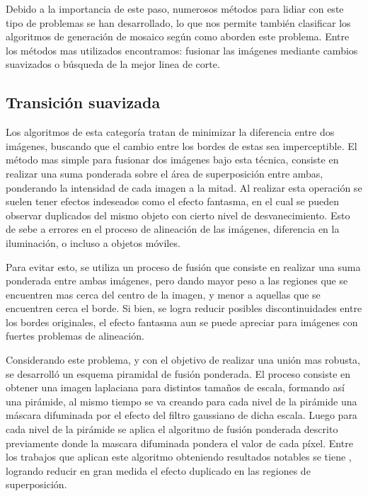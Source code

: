 Debido a la importancia de este paso, numerosos métodos para lidiar con este tipo de problemas se han desarrollado, lo que nos permite también clasificar los algoritmos de generación de mosaico según como aborden este problema. Entre los métodos mas utilizados encontramos: fusionar las imágenes mediante cambios suavizados o búsqueda de la mejor linea de corte.

\subsection*{Transición suavizada}

Los algoritmos de esta categoría tratan de minimizar la diferencia entre dos imágenes, buscando que el cambio entre los bordes de estas sea imperceptible. El método mas simple para fusionar dos imágenes bajo esta técnica, consiste en realizar una suma ponderada sobre el área de superposición entre ambas, ponderando la intensidad de cada imagen a la mitad. Al realizar esta operación se suelen tener efectos indeseados como el efecto fantasma, en el cual se pueden observar duplicados del mismo objeto con cierto nivel de desvanecimiento. Esto de sebe a errores en el proceso de alineación de las imágenes, diferencia en la iluminación, o incluso a objetos móviles. 

Para evitar esto, se utiliza un proceso de fusión que consiste en realizar una suma ponderada entre ambas imágenes, pero dando mayor peso a las regiones que se encuentren mas cerca del centro de la imagen, y menor a aquellas que se encuentren cerca el borde. Si bien, se logra reducir posibles discontinuidades entre los bordes originales, el efecto fantasma aun se puede apreciar para imágenes con fuertes problemas de alineación.

Considerando este problema, y con el objetivo de realizar una unión mas robusta, se desarrolló un esquema piramidal de fusión ponderada. El proceso consiste en obtener una imagen laplaciana para distintos tamaños de escala, formando así una pirámide, al mismo tiempo se va creando para cada nivel de la pirámide una máscara difuminada por el efecto del filtro gaussiano de dicha escala. Luego para cada nivel de la pirámide se aplica el algoritmo de fusión ponderada descrito previamente donde la mascara  difuminada pondera el valor de cada píxel. Entre los trabajos que aplican este algoritmo obteniendo resultados notables se tiene \cite{multiband}, logrando reducir en gran medida el efecto duplicado en las regiones de superposición.

